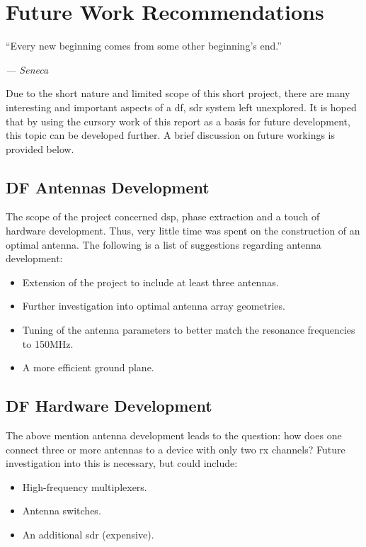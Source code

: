 \documentclass[class=report,11pt,crop=false]{standalone}
\begin{document}
\chapter{Future Work Recommendations \label{ch:fw}}
\epigraph{``Every new beginning comes from some other beginning’s end.''}%
    {\emph{--- Seneca}}
\vspace{0.5cm}

Due to the short nature and limited scope of this short project, there are  many interesting and important aspects of a \gls{df}, \gls{sdr} system left unexplored. It is hoped that by using the cursory work of this report as a basis for future development, this topic can be developed further. A brief discussion on future workings is provided below. 

\section{DF Antennas Development}
The scope of the project concerned \gls{dsp}, phase extraction and a touch of hardware development. Thus, very little time was spent on the construction of an optimal antenna. The following is a list of suggestions regarding antenna development:

\begin{itemize}
    \item Extension of the project to include at least three antennas.
    \item Further investigation into optimal antenna array geometries.
    \item Tuning of the antenna parameters to better match the resonance frequencies to 150MHz. 
    \item A more efficient ground plane. 
\end{itemize}

\section{DF Hardware Development}
The above mention antenna development leads to the question: how does one connect three or more antennas to a device with only two \gls{rx} channels? Future investigation into this is necessary, but could include:

\begin{itemize}
    \item High-frequency multiplexers.
    \item Antenna switches.
    \item An additional \gls{sdr} (expensive).
\end{itemize}
\end{document}
